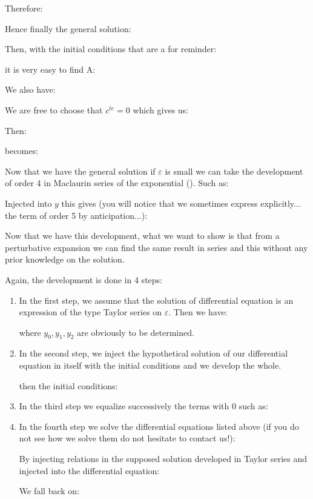 	Therefore:
	
	Hence finally the general solution:
	
	Then, with the initial conditions that are a for reminder:
	
	it is very easy to find A:
	
	We also have:
	
	We are free to choose that $c^{te}=0$ which gives us:
	
	Then:
	
	becomes:
	
	Now that we have the general solution if $\varepsilon$ is small we can take the development of order 4 in Maclaurin series of the exponential (). Such as:
	
	Injected into $y$ this gives (you will notice that we sometimes express explicitly... the term of order 5 by anticipation...):
	
	Now that we have this development, what we want to show is that from a perturbative expansion we can find the same result in series and this without any prior knowledge on the solution.
	
	Again, the development is done in 4 steps:
	\begin{enumerate}
		\item In the first step, we assume that the solution of differential equation is an expression of the type Taylor series on  $\varepsilon$. Then we have:
		
		where $y_0,y_1,y_2$ are obviously to be determined.
		
		\item In the second step, we inject the hypothetical solution of our differential equation in itself with the initial conditions and we develop the whole.
		
		then the initial conditions:
		
	
		\item In the third step we equalize successively the terms with $0$ such as:
		
		
		\item In the fourth step we solve the differential equations listed above (if you do not see how we solve them do not hesitate to contact us!):
		
		By injecting relations in the supposed solution developed in Taylor series and injected into the differential equation:
		
		We fall back on:
		
	\end{enumerate}
	
